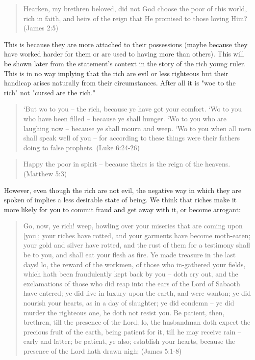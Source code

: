 \documentclass[11pt]{article}
\begin{document}
\begin{quote} 
Hearken, my brethren beloved, did not God choose the poor of this world, rich in faith, and heirs of the reign that He promised to those loving Him? (James 2:5)
\end{quote}
This is because they are more attached to their possessions (maybe because they have worked harder for them or are used to having more than others). This will be shown later from the statement's context in the story of the rich young ruler. This is in no way implying that the rich are evil or less righteous but their handicap arises naturally from their circumstances. After all it is "woe to the rich" not "cursed are the rich."
\begin{quote}
`But wo to you -- the rich, because ye have got your comfort.
`Wo to you who have been filled -- because ye shall hunger. `Wo to you who are laughing now -- because ye shall mourn and weep.
`Wo to you when all men shall speak well of you -- for according to these things were their fathers doing to false prophets. (Luke 6:24-26)
\end{quote}
\begin{quote}
Happy the poor in spirit -- because theirs is the reign of the heavens. (Matthew 5:3) 
\end{quote}
However, even though the rich are not evil, the negative way in which they are spoken of implies a less desirable state of being. We think that riches make it more likely for you to commit fraud and get away with it, or become arrogant:
\begin{quote}
Go, now, ye rich! weep, howling over your miseries that are coming upon [you];
your riches have rotted, and your garments have become moth-eaten;
your gold and silver have rotted, and the rust of them for a testimony shall be to you, and shall eat your flesh as fire. Ye made treasure in the last days!
lo, the reward of the workmen, of those who in-gathered your fields, which hath been fraudulently kept back by you -- doth cry out, and the exclamations of those who did reap into the ears of the Lord of Sabaoth have entered;
ye did live in luxury upon the earth, and were wanton; ye did nourish your hearts, as in a day of slaughter;
ye did condemn -- ye did murder the righteous one, he doth not resist you.
Be patient, then, brethren, till the presence of the Lord; lo, the husbandman doth expect the precious fruit of the earth, being patient for it, till he may receive rain -- early and latter;
be patient, ye also; establish your hearts, because the presence of the Lord hath drawn nigh; (James 5:1-8)
\end{quote}
\end{document}
